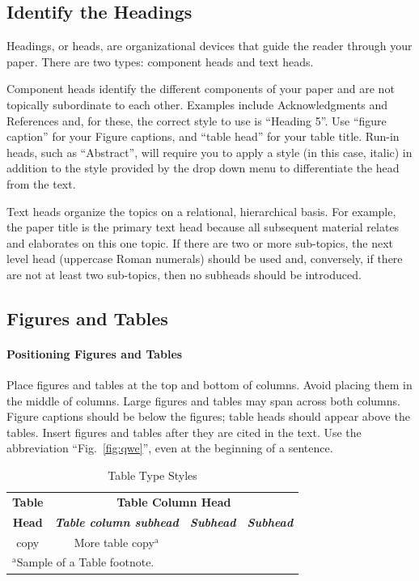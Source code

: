 \documentclass[conference]{IEEEtran}
\begin{document}
\subsection{Identify the Headings}\label{ITH}
Headings, or heads, are organizational devices that guide the reader through 
your paper. There are two types: component heads and text heads.

Component heads identify the different components of your paper and are not 
topically subordinate to each other. Examples include Acknowledgments and 
References and, for these, the correct style to use is ``Heading 5''. Use 
``figure caption'' for your Figure captions, and ``table head'' for your 
table title. Run-in heads, such as ``Abstract'', will require you to apply a 
style (in this case, italic) in addition to the style provided by the drop 
down menu to differentiate the head from the text.

Text heads organize the topics on a relational, hierarchical basis. For 
example, the paper title is the primary text head because all subsequent 
material relates and elaborates on this one topic. If there are two or more 
sub-topics, the next level head (uppercase Roman numerals) should be used 
and, conversely, if there are not at least two sub-topics, then no subheads 
should be introduced.

\subsection{Figures and Tables}\label{FAT}
\paragraph{Positioning Figures and Tables} Place figures and tables at the top and 
bottom of columns. Avoid placing them in the middle of columns. Large 
figures and tables may span across both columns. Figure captions should be 
below the figures; table heads should appear above the tables. Insert 
figures and tables after they are cited in the text. Use the abbreviation 
``Fig.~\ref{fig:qwe}'', even at the beginning of a sentence.

\begin{table}[htbp]
\caption{Table Type Styles}
\begin{center}
\begin{tabular}{|c|c|c|c|}
\hline
\textbf{Table}&\multicolumn{3}{|c|}{\textbf{Table Column Head}} \\
\cline{2-4} 
\textbf{Head} & \textbf{\textit{Table column subhead}}& \textbf{\textit{Subhead}}& \textbf{\textit{Subhead}} \\
\hline
copy& More table copy$^{\mathrm{a}}$& &  \\
\hline
\multicolumn{4}{l}{$^{\mathrm{a}}$Sample of a Table footnote.}
\end{tabular}
\label{tab1}
\end{center}
\end{table}
\end{document}
